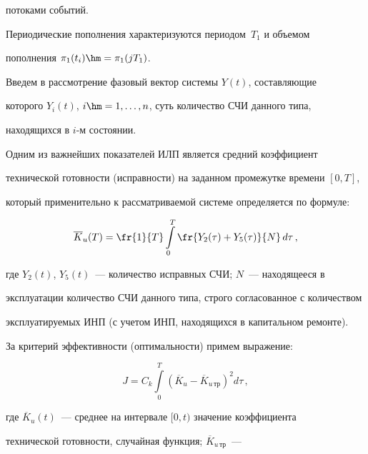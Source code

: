 потоками событий.



    Периодические пополнения характеризуются периодом~$T_1$ и объемом

пополнения $\pi_1(t_i)\hm= \pi_1(jT_1)$.



     Введем в рассмотрение фазовый вектор системы $Y(t)$, со\-став\-ля\-ющие

которого $Y_i(t)$, $i\hm= 1,\ldots ,n$, суть количество СЧИ данного типа,

находящихся в $i$-м со\-сто\-янии.



     Одним из важнейших показателей ИЛП является средний коэффициент

технической готовности (исправности) на заданном промежутке времени $[0, T]$,

который применительно к рассматриваемой системе определяется по формуле:



\noindent

\begin{equation*}

\overline{K}_u(T) =\fr{1}{T}\int\limits_0^T \fr{Y_2(\tau) +Y_5(\tau)}{N}\,d\tau\,,


\end{equation*}

где $Y_2(t)$, $Y_5(t)$~--- количество исправных СЧИ; $N$~--- находящееся в

эксплуатации количество СЧИ данного типа, строго согласованное с количеством

эксплуатируемых ИНП (с учетом ИНП, находящихся в капитальном ремонте).





    За критерий эффективности (оптимальности) примем выражение:

\begin{equation*}

J=C_k\int\limits_0^T \left( \overline{K}_u - \overline{K}_{u\,\mathrm{тр}}\right)^2d\tau\,,


\end{equation*}

где $\overline{K}_u(t)$~--- среднее на интервале $[0, t)$ значение коэффициента

технической готовности, случайная функция; $\overline{K}_{u\,\mathrm{тр}}$~---


